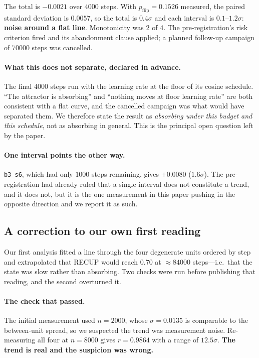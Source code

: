 \documentclass[11pt,a4paper]{article}
\begin{document}
The total is $\mathbf{-0.0021}$ over $4000$ steps. With $p_{\mathrm{flip}} = 0.1526$ measured, the
paired standard deviation is $0.0057$, so the total is $0.4\sigma$ and each interval is $0.1$--$1.2\sigma$:
\textbf{noise around a flat line}. Monotonicity was $2$ of $4$. The pre-registration's risk criterion
fired and its abandonment clause applied; a planned follow-up campaign of $70000$ steps was
cancelled.

\paragraph{What this does not separate, declared in advance.} The final $4000$ steps run with the
learning rate at the floor of its cosine schedule. ``The attractor is absorbing'' and ``nothing moves
at floor learning rate'' are both consistent with a flat curve, and the cancelled campaign was what
would have separated them. We therefore state the result as \emph{absorbing under this budget and
this schedule}, not as absorbing in general. This is the principal open question left by the paper.

\paragraph{One interval points the other way.} \texttt{b3\_s6}, which had only $1000$ steps
remaining, gives $+0.0080$ ($1.6\sigma$). The pre-registration had already ruled that a single
interval does not constitute a trend, and it does not, but it is the one measurement in this paper
pushing in the opposite direction and we report it as such.

\subsection{A correction to our own first reading}
\label{sec:correccion}

Our first analysis fitted a line through the four degenerate units ordered by step and extrapolated
that RECUP would reach $0.70$ at $\approx 84000$ steps---i.e.\ that the state was slow rather than
absorbing. Two checks were run before publishing that reading, and the second overturned it.

\paragraph{The check that passed.} The initial measurement used $n=2000$, whose $\sigma = 0.0135$ is
comparable to the between-unit spread, so we suspected the trend was measurement noise. Re-measuring
all four at $n=8000$ gives $r = 0.9864$ with a range of $12.5\sigma$. \textbf{The trend is real and
the suspicion was wrong.}
\end{document}
